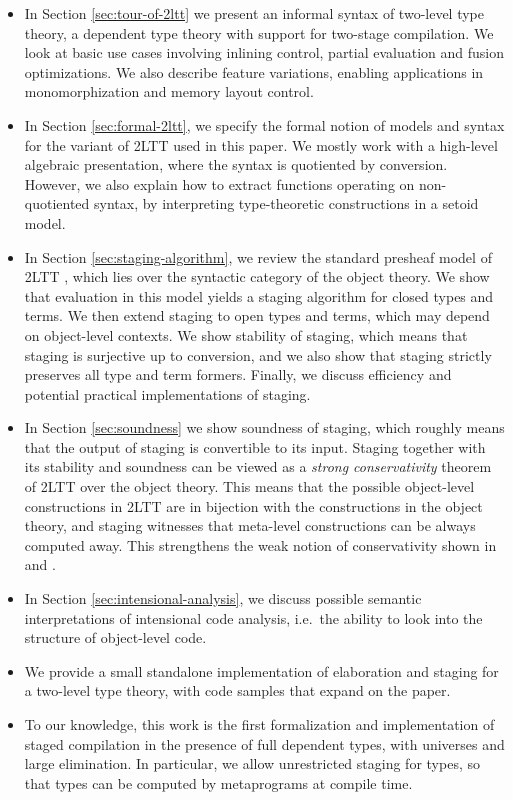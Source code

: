 \documentclass[acmsmall,review]{acmart}
\theoremstyle{remark}
\begin{document}
\begin{itemize}
  \item In Section \ref{sec:tour-of-2ltt} we present an informal syntax of
    two-level type theory, a dependent type theory with support for two-stage
    compilation. We look at basic use cases involving inlining control, partial
    evaluation and fusion optimizations. We also describe feature variations,
    enabling applications in monomorphization and memory layout control.
  \item In Section \ref{sec:formal-2ltt}, we specify the formal notion of models
    and syntax for the variant of 2LTT used in this paper. We mostly work with a
    high-level algebraic presentation, where the syntax is quotiented by
    conversion. However, we also explain how to extract functions
    operating on non-quotiented syntax, by interpreting type-theoretic
    constructions in a setoid model.
  \item
    In Section \ref{sec:staging-algorithm}, we review the standard presheaf
    model of 2LTT \cite[Section~2.5.3]{twolevel}, which lies over the syntactic
    category of the object theory. We show that evaluation in this model yields
    a staging algorithm for closed types and terms. We then extend staging to
    open types and terms, which may depend on object-level contexts. We show
    stability of staging, which means that staging is surjective up to
    conversion, and we also show that staging strictly preserves all type and
    term formers. Finally, we discuss efficiency and potential practical implementations
    of staging.
  \item
    In Section \ref{sec:soundness} we show soundness of staging, which roughly means that
    the output of staging is convertible to its input. Staging together with
    its stability and soundness can be viewed as a \emph{strong conservativity}
    theorem of 2LTT over the object theory. This means that the possible
    object-level constructions in 2LTT are in bijection with the constructions
    in the object theory, and staging witnesses that meta-level constructions
    can be always computed away. This strengthens the weak notion of
    conservativity shown in \cite{capriotti2017models} and \cite{twolevel}.
  \item
    In Section \ref{sec:intensional-analysis}, we discuss possible semantic
    interpretations of intensional code analysis, i.e.\ the ability to look into
    the structure of object-level code.
  \item We provide a small standalone implementation of elaboration and staging
    for a two-level type theory, with code samples that expand on the paper.
  \item To our knowledge, this work is the first formalization and implementation of
    staged compilation in the presence of full dependent types, with
    universes and large elimination. In particular, we allow unrestricted
    staging for types, so that types can be computed by metaprograms at compile
    time.
\end{itemize}
\end{document}
